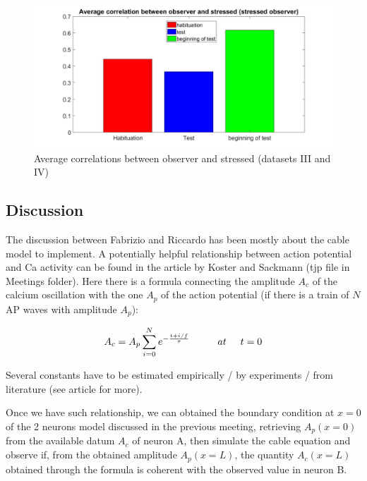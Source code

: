 \documentclass[a4paper]{article}
\begin{document}
	
	\begin{figure}[H]
		\begin{center}
			\hspace*{-1cm}
			\includegraphics[scale=.36]{avg_corr_stress2.jpg} 
		\end{center}  
		\caption{Average correlations between observer and stressed (datasets III and IV)}
		
	\end{figure}
		
		
		\subsection{Discussion}	
		
	The discussion between Fabrizio and Riccardo has been mostly about the cable model to implement. A potentially helpful relationship between action potential and Ca activity can be found in the article by Koster and Sackmann (tjp file in Meetings folder). Here there is a formula connecting the amplitude $A_c$ of the calcium oscillation with the one $A_p$ of the action potential (if there is a train of $N$ AP waves with amplitude $A_p$):
	
	$$ A_c = A_p \sum_{i=0}^{N}e^{-\frac{t+i/f}{\tau}}  \hspace{1 cm} at  \hspace{0.5 cm} t=0 $$
		
		
	Several constants have to be estimated empirically / by experiments / from literature (see article for more).
	
	Once we have such relationship, we can obtained the boundary condition at $x=0$ of the 2 neurons model discussed in the previous meeting, retrieving $A_p(x=0)$ from the available  datum	$A_c$ of neuron A, then simulate the cable equation and observe if, from the obtained amplitude $A_p(x=L)$, the quantity $A_c (x=L)$ obtained through the formula is coherent with the observed value in neuron B.
		
\end{document}
